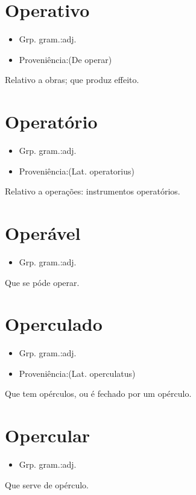 \section{Operativo}
\begin{itemize}
\item {Grp. gram.:adj.}
\end{itemize}
\begin{itemize}
\item {Proveniência:(De \textunderscore operar\textunderscore )}
\end{itemize}
Relativo a obras; que produz effeito.
\section{Operatório}
\begin{itemize}
\item {Grp. gram.:adj.}
\end{itemize}
\begin{itemize}
\item {Proveniência:(Lat. \textunderscore operatorius\textunderscore )}
\end{itemize}
Relativo a operações: \textunderscore instrumentos operatórios\textunderscore .
\section{Operável}
\begin{itemize}
\item {Grp. gram.:adj.}
\end{itemize}
Que se póde operar.
\section{Operculado}
\begin{itemize}
\item {Grp. gram.:adj.}
\end{itemize}
\begin{itemize}
\item {Proveniência:(Lat. \textunderscore operculatus\textunderscore )}
\end{itemize}
Que tem opérculos, ou é fechado por um opérculo.
\section{Opercular}
\begin{itemize}
\item {Grp. gram.:adj.}
\end{itemize}
Que serve de opérculo.
